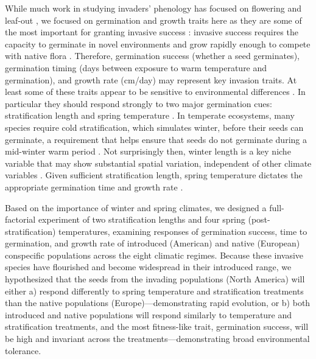 \documentclass[11pt]{article}\usepackage[]{graphicx}\usepackage[]{color}
\begin{document}
While much work in studying invaders' phenology has focused on flowering and leaf-out \parencite[e.g.,][]{Zohner2017}, we focused on germination and growth traits here as they are some of the most important for granting invasive success \parencite{Sattin1997, Maillet2000}: invasive success requires the capacity to germinate in novel environments and grow rapidly enough to compete with native flora \parencite{Grime1988, Gioria2017}. Therefore, germination success (whether a seed germinates), germination timing (days between exposure to warm temperature and germination), and growth rate (cm/day) may represent key invasion traits. At least some of these traits appear to be sensitive to environmental differences \parencite{Leger2007}.  In particular they should respond strongly to two major germination cues: stratification length and spring temperature \parencite{Finch2006}. In temperate ecosystems, many species require cold stratification, which simulates winter, before their seeds can germinate, a requirement that helps ensure that seeds do not germinate during a mid-winter warm period \parencite{Baskin1998,Popay1970,Wulff1994}. Not surprisingly then, winter length is a key niche variable \parencite{Harte2015} that may show substantial spatial variation, independent of other climate variables \parencite{Bonan2003}. Given sufficient stratification length, spring temperature dictates the appropriate germination time and growth rate \parencite{Egli1980,Guilioni2003}. 

Based on the importance of winter and spring climates, we designed a full-factorial experiment of two stratification lengths and four spring (post-stratification) temperatures, examining responses of germination success, time to germination, and growth rate of introduced (American) and native (European) conspecific populations across the eight climatic regimes. Because these invasive species have flourished and become widespread in their introduced range, we hypothesized that the seeds from the invading populations (North America) will either a) respond differently to spring temperature and stratification treatments than the native populations (Europe)---demonstrating rapid evolution, or b) both introduced and native populations will respond similarly to temperature and stratification treatments, and the most fitness-like trait, germination success, will be high and invariant across the treatments---demonstrating broad environmental tolerance. %
\end{document}
